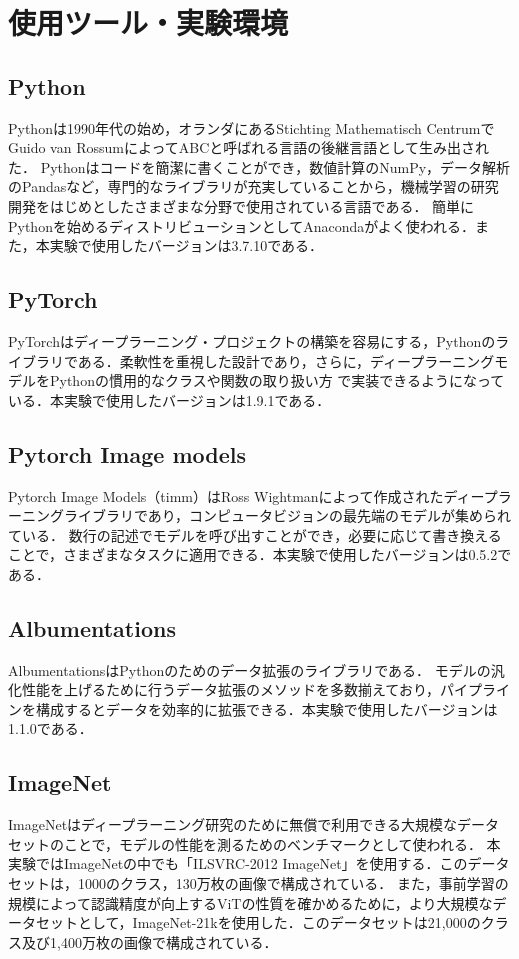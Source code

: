 \documentclass[a4paper, oneside, openany, dvipdfmx]{suribt}%
\begin{document}
\section{使用ツール・実験環境}
\subsection{Python\cite{pythondoc}}
Pythonは1990年代の始め，オランダにあるStichting Mathematisch CentrumでGuido van RossumによってABCと呼ばれる言語の後継言語として生み出された．
Pythonはコードを簡潔に書くことができ，数値計算のNumPy，データ解析のPandasなど，専門的なライブラリが充実していることから，機械学習の研究開発をはじめとしたさまざまな分野で使用されている言語である．
簡単にPythonを始めるディストリビューションとしてAnacondaがよく使われる．また，本実験で使用したバージョンは3.7.10である．
\subsection{PyTorch\cite{Eli_Stevens2021-01-30}}
PyTorchはディープラーニング・プロジェクトの構築を容易にする，Pythonのライブラリである．柔軟性を重視した設計であり，さらに，ディープラーニングモデルをPythonの慣用的なクラスや関数の取り扱い方
で実装できるようになっている．本実験で使用したバージョンは1.9.1である．
\subsection{Pytorch Image models\cite{timmdoc}}
Pytorch Image Models（timm）はRoss Wightmanによって作成されたディープラーニングライブラリであり，コンピュータビジョンの最先端のモデルが集められている．
数行の記述でモデルを呼び出すことができ，必要に応じて書き換えることで，さまざまなタスクに適用できる．本実験で使用したバージョンは0.5.2である．
\subsection{Albumentations\cite{info11020125}}
AlbumentationsはPythonのためのデータ拡張のライブラリである．
モデルの汎化性能を上げるために行うデータ拡張のメソッドを多数揃えており，パイプラインを構成するとデータを効率的に拡張できる．本実験で使用したバージョンは1.1.0である．
\subsection{ImageNet}
ImageNetはディープラーニング研究のために無償で利用できる大規模なデータセットのことで，モデルの性能を測るためのベンチマークとして使われる．
本実験ではImageNetの中でも「ILSVRC-2012 ImageNet」を使用する．このデータセットは，1000のクラス，130万枚の画像で構成されている．
また，事前学習の規模によって認識精度が向上するViTの性質を確かめるために，より大規模なデータセットとして，ImageNet-21kを使用した．このデータセットは21,000のクラス及び1,400万枚の画像で構成されている．
\end{document}
